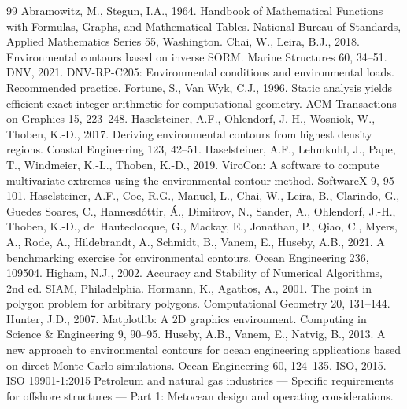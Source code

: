 \documentclass[preprint,11pt,authoryear]{elsarticle}
\begin{document}
\begin{thebibliography}{99}
 Abramowitz, M., Stegun, I.A., 1964. Handbook of Mathematical Functions with Formulas, Graphs, and Mathematical Tables. National Bureau of Standards, Applied Mathematics Series 55, Washington.
 Chai, W., Leira, B.J., 2018. Environmental contours based on inverse SORM. Marine Structures 60, 34--51.
 DNV, 2021. DNV-RP-C205: Environmental conditions and environmental loads. Recommended practice.
 Fortune, S., Van Wyk, C.J., 1996. Static analysis yields efficient exact integer arithmetic for computational geometry. ACM Transactions on Graphics 15, 223--248.
 Haselsteiner, A.F., Ohlendorf, J.-H., Wosniok, W., Thoben, K.-D., 2017. Deriving environmental contours from highest density regions. Coastal Engineering 123, 42--51.
 Haselsteiner, A.F., Lehmkuhl, J., Pape, T., Windmeier, K.-L., Thoben, K.-D., 2019. ViroCon: A software to compute multivariate extremes using the environmental contour method. SoftwareX 9, 95--101.
 Haselsteiner, A.F., Coe, R.G., Manuel, L., Chai, W., Leira, B., Clarindo, G., Guedes Soares, C., Hannesd\'ottir, \'A., Dimitrov, N., Sander, A., Ohlendorf, J.-H., Thoben, K.-D., de~Hauteclocque, G., Mackay, E., Jonathan, P., Qiao, C., Myers, A., Rode, A., Hildebrandt, A., Schmidt, B., Vanem, E., Huseby, A.B., 2021. A benchmarking exercise for environmental contours. Ocean Engineering 236, 109504.
 Higham, N.J., 2002. Accuracy and Stability of Numerical Algorithms, 2nd ed. SIAM, Philadelphia.
 Hormann, K., Agathos, A., 2001. The point in polygon problem for arbitrary polygons. Computational Geometry 20, 131--144.
 Hunter, J.D., 2007. Matplotlib: A 2D graphics environment. Computing in Science \& Engineering 9, 90--95.
 Huseby, A.B., Vanem, E., Natvig, B., 2013. A new approach to environmental contours for ocean engineering applications based on direct Monte Carlo simulations. Ocean Engineering 60, 124--135.
 ISO, 2015. ISO 19901-1:2015 Petroleum and natural gas industries --- Specific requirements for offshore structures --- Part 1: Metocean design and operating considerations.

\end{thebibliography}
\end{document}
